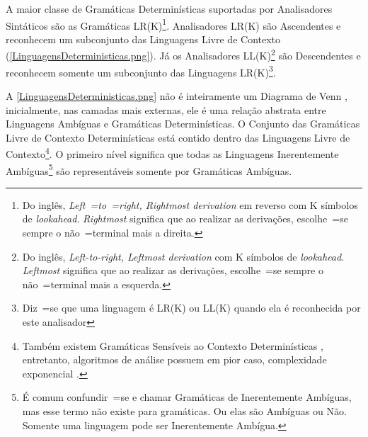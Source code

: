     A maior classe de Gramáticas Determinísticas suportadas por Analisadores Sintáticos são as Gramáticas LR(K)\footnote{
    Do inglês, \textit{Left~=to~=right,
    Rightmost derivation} em reverso com K símbolos de \textit{lookahead}.
    \textit{Rightmost} significa que ao realizar as derivações,
    escolhe~=se sempre o não~=terminal mais a direita.
    }.
    Analisadores LR(K) \cite{ahoCompilerDragonBook} são Ascendentes e
    reconhecem um subconjunto das Linguagens Livre de Contexto (\autoref{LinguagensDeterministicas.png}).
    Já os Analisadores LL(K)\footnote{
    Do inglês, \textit{Left-to-right,
    Leftmost derivation} com K símbolos de \textit{lookahead}.
    \textit{Leftmost} significa que ao realizar as derivações,
    escolhe~=se sempre o não~=terminal mais a esquerda.
    }
    são Descendentes \cite{antlrBookTerrentParr,llStarAntlr,allStarAntlr} e
    reconhecem somente um subconjunto das Linguagens LR(K)\footnote{
    Diz~=se que uma linguagem é LR(K) ou
    LL(K) quando ela é reconhecida por este analisador
    }.

    A \autoref{LinguagensDeterministicas.png} não é inteiramente um Diagrama de Venn \cite{generalizedVennDiagrams},
    inicialmente,
    nas camadas mais externas,
    ele é uma relação abstrata entre Linguagens Ambíguas e
    Gramáticas Determinísticas.
    O Conjunto das Gramáticas Livre de Contexto Determinísticas está contido dentro das Linguagens Livre de Contexto\footnote{
    Também existem Gramáticas Sensíveis ao Contexto Determinísticas \cite{contextSensitiveParsing},
    entretanto,
    algoritmos de análise possuem em pior caso,
    complexidade exponencial \cite{areContextSensitiveGrammarWithPolynomialTime}.
    }.
    O primeiro nível significa que todas as Linguagens Inerentemente Ambíguas\footnote{
    É comum confundir~=se e
    chamar Gramáticas de Inerentemente Ambíguas,
    mas esse termo não existe para gramáticas.
    Ou elas são Ambíguas ou
    Não.
    Somente uma linguagem pode ser Inerentemente Ambígua.
    }
    são representáveis somente por Gramáticas Ambíguas.

